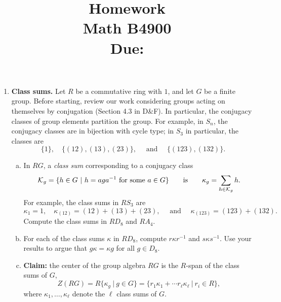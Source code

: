 \documentclass[11pt, reqno]{amsart}
\title[Homework \HW]{Homework \HW \\
Math B4900\\
\small Due: \DUE}
\author{}
\theoremstyle{plain}
\theoremstyle{definition}
\theoremstyle{example}
\def\HW{1}
\def\DUE{2/12/2021}
\begin{document}
\maketitle %


\begin{enumerate}[1.]
\item \textbf{Class sums.}
Let $R$ be a commutative ring with $1$, and let $G$ be a finite group. Before starting, review our work considering groups acting on themselves by conjugation (Section 4.3 in D\&F). In particular, the conjugacy classes of group elements partition the group. For example, in $S_n$, the conjugacy classes are in bijection with cycle type; in $S_3$ in particular, the classes are 
$$\{1\}, \quad \{(12), (13), (23)\}, \quad \text{ and } \quad \{(123), (132)\}.$$
\begin{enumerate}[(a)]
\item In $RG$, a \emph{class sum} corresponding to a conjugacy class 
$$\mathcal{K}_g = \{h \in G ~|~ h = aga^{-1} \text{ for some }a \in G\} \qquad  \text{is}  \qquad 
	\kappa_g = \sum_{h \in \mathcal{K}_g} h.$$
 For example, the class sums in $RS_3$ are 
$$\kappa_1 = 1, \quad \kappa_{(12)} = (12) + (13) +  (23), \quad  \text{ and } \quad 
	\kappa_{(123)} = (123) + (132).$$
Compute the class sums in $RD_8$ and $RA_4$. 

\item For each of the class sums $\kappa$ in $RD_8$, compute $r\kappa r^{-1}$ and $s \kappa s^{-1}$. Use your results to argue that $g \kappa = \kappa g$ for all $g \in D_8$. 

\item \textbf{Claim:} the center of the group algebra $RG$ is the $R$-span of the class sums of $G$,
$$Z(RG) = R\{\kappa_g ~|~ g \in G\}  = \{ r_1 \kappa_1 + \cdots r_\ell \kappa_\ell ~|~ r _i \in R\},$$
where $\kappa_1, \dots, \kappa_\ell$ denote the $\ell$ class sums of $G$. 


\end{enumerate}
\end{enumerate}
\end{document}
